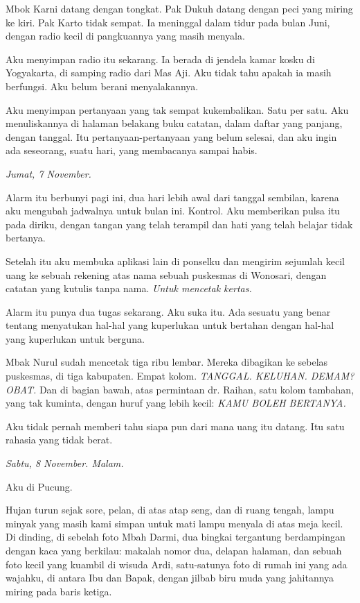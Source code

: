 \documentclass[11pt,twoside,openany]{book}
\makeatletter
\newcommand{\scenebreak}{\par\vspace{0.9em}{\centering\textsc{*\hspace{0.7em}*\hspace{0.7em}*}\par}\vspace{0.9em}\@afterindentfalse\@afterheading}
\makeatother
\begin{document}
Mbok Karni datang dengan tongkat. Pak Dukuh datang dengan peci yang miring ke kiri. Pak Karto tidak sempat. Ia meninggal dalam tidur pada bulan Juni, dengan radio kecil di pangkuannya yang masih menyala.

Aku menyimpan radio itu sekarang. Ia berada di jendela kamar kosku di Yogyakarta, di samping radio dari Mas Aji. Aku tidak tahu apakah ia masih berfungsi. Aku belum berani menyalakannya.

Aku menyimpan pertanyaan yang tak sempat kukembalikan. Satu per satu. Aku menuliskannya di halaman belakang buku catatan, dalam daftar yang panjang, dengan tanggal. Itu pertanyaan-pertanyaan yang belum selesai, dan aku ingin ada seseorang, suatu hari, yang membacanya sampai habis.

\scenebreak
\emph{Jumat, 7 November.}

Alarm itu berbunyi pagi ini, dua hari lebih awal dari tanggal sembilan, karena aku mengubah jadwalnya untuk bulan ini. Kontrol. Aku memberikan pulsa itu pada diriku, dengan tangan yang telah terampil dan hati yang telah belajar tidak bertanya.

Setelah itu aku membuka aplikasi lain di ponselku dan mengirim sejumlah kecil uang ke sebuah rekening atas nama sebuah puskesmas di Wonosari, dengan catatan yang kutulis tanpa nama. \emph{Untuk mencetak kertas.}

Alarm itu punya dua tugas sekarang. Aku suka itu. Ada sesuatu yang benar tentang menyatukan hal-hal yang kuperlukan untuk bertahan dengan hal-hal yang kuperlukan untuk berguna.

Mbak Nurul sudah mencetak tiga ribu lembar. Mereka dibagikan ke sebelas puskesmas, di tiga kabupaten. Empat kolom. \emph{TANGGAL. KELUHAN. DEMAM? OBAT.} Dan di bagian bawah, atas permintaan dr. Raihan, satu kolom tambahan, yang tak kuminta, dengan huruf yang lebih kecil: \emph{KAMU BOLEH BERTANYA.}

Aku tidak pernah memberi tahu siapa pun dari mana uang itu datang. Itu satu rahasia yang tidak berat.

\scenebreak
\emph{Sabtu, 8 November. Malam.}

Aku di Pucung.

Hujan turun sejak sore, pelan, di atas atap seng, dan di ruang tengah, lampu minyak yang masih kami simpan untuk mati lampu menyala di atas meja kecil. Di dinding, di sebelah foto Mbah Darmi, dua bingkai tergantung berdampingan dengan kaca yang berkilau: makalah nomor dua, delapan halaman, dan sebuah foto kecil yang kuambil di wisuda Ardi, satu-satunya foto di rumah ini yang ada wajahku, di antara Ibu dan Bapak, dengan jilbab biru muda yang jahitannya miring pada baris ketiga.
\end{document}
